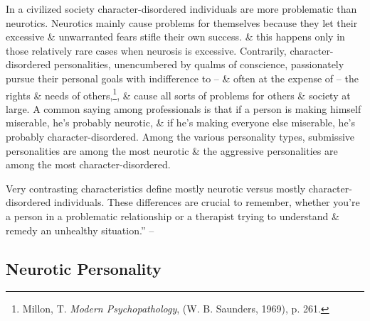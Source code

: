 \documentclass{article}
\numberwithin{equation}{section}
\begin{document}
In a civilized society character-disordered individuals are more problematic than neurotics. Neurotics mainly cause problems for themselves because they let their excessive \& unwarranted fears stifle their own success. \& this happens only in those relatively rare cases when neurosis is excessive. Contrarily, character-disordered personalities, unencumbered by qualms of conscience, passionately pursue their personal goals with indifference to -- \& often at the expense of -- the rights \& needs of others,\footnote{Millon, T. \textit{Modern Psychopathology}, (W. B. Saunders, 1969), p. 261.}, \& cause all sorts of problems for others \& society at large. A common saying among professionals is that if a person is making himself miserable, he's probably neurotic, \& if he's making everyone else miserable, he's probably character-disordered. Among the various personality types, submissive personalities are among the most neurotic \& the aggressive personalities are among the most character-disordered.

Very contrasting characteristics define mostly neurotic versus mostly character-disordered individuals. These differences are crucial to remember, whether you're a person in a problematic relationship or a therapist trying to understand \& remedy an unhealthy situation.'' -- \cite[pp. 29--31]{Simon2010}

\subsection{Neurotic Personality}
\end{document}
